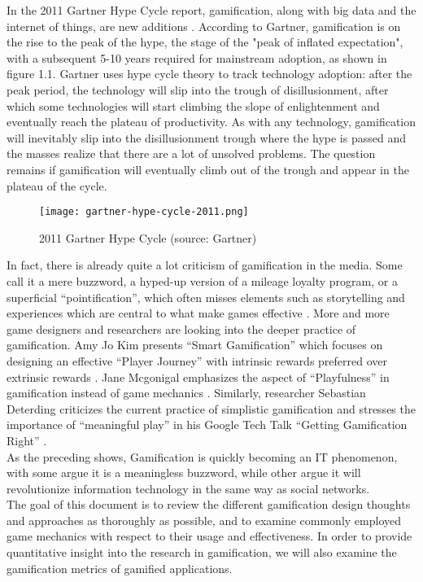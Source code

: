 In the 2011 Gartner Hype Cycle report, gamification, along with big data and the internet of things, are new additions \cite {gartnerPress2011HypeCycle}. According to Gartner, gamification is on the rise to the peak of the hype, the stage of the "peak of inflated expectation", with a subsequent 5-10 years required for mainstream adoption, as shown in figure 1.1. 
Gartner uses hype cycle theory to track technology adoption: after the peak period, the technology will slip into the trough of disillusionment, after which some technologies will start climbing the slope of enlightenment and eventually reach the plateau of productivity.  As with any technology, gamification will inevitably slip into the disillusionment trough where the hype is passed and the masses realize that there are a lot of unsolved problems. The question remains if gamification will eventually climb out of the trough and appear in the plateau of the cycle.

\begin{figure}[htbp]
	\centering
		\texttt{[image: gartner-hype-cycle-2011.png]}
		\caption{2011 Gartner Hype Cycle (source: Gartner) \cite {gartnerPress2011HypeCycle}}
		\label{fig:Gartner-2011-Hype-Cycle}
\end{figure}

In fact, there is already quite a lot criticism of gamification in the media. Some call it a mere buzzword, a hyped-up version of a mileage loyalty program, or a superficial ``pointification'', which often misses elements such as storytelling and experiences which are central to what make games effective  \cite {robertson2010}. More and more game designers and researchers are looking into the deeper practice of gamification. Amy Jo Kim presents ``Smart Gamification'' which focuses on designing an effective ``Player Journey'' with intrinsic rewards preferred over extrinsic rewards \cite {Kim2010}. Jane Mcgonigal emphasizes the aspect of ``Playfulness'' in gamification instead of game mechanics \cite {mcgonigal2011}. Similarly, researcher Sebastian Deterding criticizes the current practice of simplistic gamification and stresses the importance of ``meaningful play'' in his Google Tech Talk ``Getting Gamification Right'' \cite {Deterding2011meaningful}.\\

As the preceding shows, Gamification is quickly becoming an IT phenomenon, with some argue it is a meaningless buzzword, while other argue it will revolutionize information technology in the same way as social networks.\\

The goal of this document is to review the different gamification design thoughts and approaches as thoroughly as possible, and to examine commonly employed game mechanics with respect to their usage and effectiveness. In order to provide quantitative insight into the research in gamification, we will also examine the gamification metrics of gamified applications.
